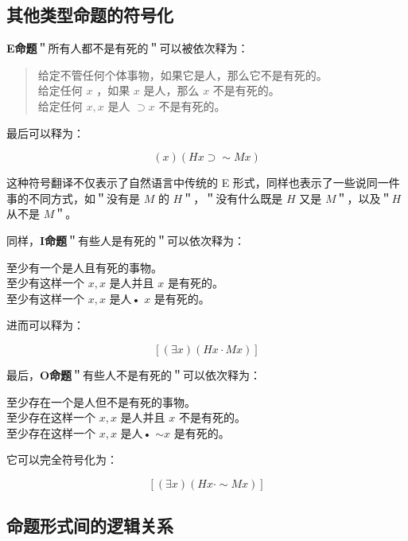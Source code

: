 \subsection{其他类型命题的符号化}

\textbf{E命题}＂所有人都不是有死的＂可以被依次释为：

\begin{quote}
给定不管任何个体事物，如果它是人，那么它不是有死的。\\
给定任何 $x$ ，如果 $x$ 是人，那么 $x$ 不是有死的。\\
给定任何 $x, x$ 是人 $\supset x$ 不是有死的。
\end{quote}

最后可以释为：

$$
(x)(H x \supset \sim M x)
$$

这种符号翻译不仅表示了自然语言中传统的 E 形式，同样也表示了一些说同一件事的不同方式，如＂没有是 $M$ 的 $H$＂，＂没有什么既是 $H$ 又是 $M$＂，以及＂$H$ 从不是 $M$＂。

同样，\textbf{I命题}＂有些人是有死的＂可以依次释为：

至少有一个是人且有死的事物。\\
至少有这样一个 $x, x$ 是人并且 $x$ 是有死的。\\
至少有这样一个 $x, x$ 是人• $x$ 是有死的。

进而可以释为：

$$
[(\exists x)(H x \cdot M x)]
$$

最后，\textbf{O命题}＂有些人不是有死的＂可以依次释为：

至少存在一个是人但不是有死的事物。\\
至少存在这样一个 $x, x$ 是人并且 $x$ 不是有死的。\\
至少存在这样一个 $x, x$ 是人• $\sim x$ 是有死的。

它可以完全符号化为：

$$
[(\exists x)(H x \cdot \sim M x)]
$$

\subsection{命题形式间的逻辑关系}

